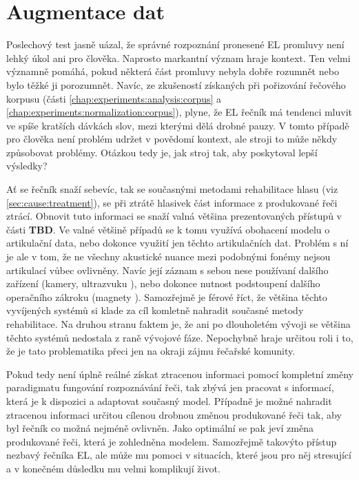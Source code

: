\section{Augmentace dat}
\label{chap:experiments:augmentation}

Poslechový test jasně uázal, že správné rozpoznání pronesené EL promluvy není lehký úkol ani pro člověka. Naprosto markantní význam hraje kontext. Ten velmi významně pomáhá, pokud některá část promluvy nebyla dobře rozumnět nebo bylo těžké ji porozumnět. Navíc, ze zkušeností získaných při pořizování řečového korpusu (části \ref{chap:experiments:analysis:corpus} a \ref{chap:experiments:normalization:corpus}), plyne, že EL řečník má tendenci mluvit ve spíše kratších dávkách slov, mezi kterými dělá drobné pauzy. V tomto případě pro člověka není problém udržet v povědomí kontext, ale stroji to může někdy způsobovat problémy. Otázkou tedy je, jak  stroj tak, aby poskytoval lepší výsledky?

Ať se řečník snaží sebevíc, tak se současnými metodami rehabilitace hlasu (viz \ref{sec:cause:treatment}), se při ztrátě hlasivek část informace z produkované řeči ztrácí. Obnovit tuto informaci se snaží valná většina prezentovaných přístupů v části \textbf{TBD}. Ve valné většině případů se k tomu využívá obohacení modelu o artikulační data, nebo dokonce využití jen těchto artikulačních dat. \cite{Denby2010} \cite{Hofe2013} Problém s ní je ale v tom, že ne všechny akustické nuance mezi podobnými fonémy nejsou artikulací vůbec ovlivněny. Navíc její záznam s sebou nese používaní dalšího zařízení (kamery, ultrazvuku \cite{Hueber2010}), nebo dokonce nutnost podstoupení dalšího operačního zákroku (magnety \cite{Hofe2011}). Samozřejmě je férové říct, že většina těchto vyvíjených systémů si klade za cíl komletně nahradit současné metody rehabilitace. Na druhou stranu faktem je, že ani po dlouholetém vývoji se většina těchto systémů nedostala z raně vývojové fáze. Nepochybně hraje určitou roli i to, že je tato problematika přeci jen na okraji zájmu řečařské komunity.

Pokud tedy není úplně reálné získat ztracenou informaci pomocí kompletní změny paradigmatu fungování rozpoznávání řeči, tak zbývá jen pracovat s informací, která je k dispozici a adaptovat současný model. Případně je možné nahradit ztracenou informaci určitou cílenou drobnou změnou produkované řeči tak, aby byl řečník co možná nejméně ovlivněn. Jako optimální se pak jeví změna produkované řeči, která je zohledněna modelem. Samozřejmě takovýto přístup nezbavý řečníka EL, ale může mu pomoci v situacích, které jsou pro něj stresující a v konečném důsledku mu velmi komplikují život.

